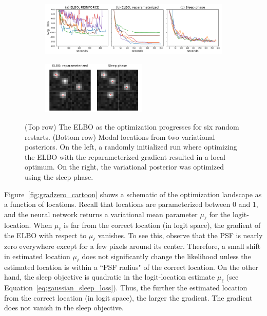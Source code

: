 \begin{figure}[!htb]
    \centering
    \begin{subfigure}[t]{0.9\textwidth}
    \centering
    \includegraphics[width=\textwidth]{figures/optim_path_compare.png}
    \end{subfigure}
    \begin{subfigure}[t]{\textwidth}
    \centering
    \includegraphics[width=0.55\textwidth]{figures/optim_path_detect_compare.png}
    \end{subfigure}
    \vspace{-3em}
    \caption{(Top row) The ELBO as the optimization progresses for six random restarts. 
    (Bottom row) Modal locations from two variational posteriors.
    On the left, a randomly initialized run where optimizing the ELBO with the reparameterized gradient resulted in a local optimum.
    On the right, the variational posterior 
    was optimized using the sleep phase. }
    \label{fig:optim_path}
\end{figure}

Figure~\ref{fig:gradzero_cartoon} shows a schematic of the optimization landscape as a function of locations.
Recall that locations are parameterized between 0 and 1, and the neural network returns a variational mean parameter $\mu_\ell$ for the logit-location. 
When $\mu_\ell$ is far from the correct location (in logit space), the gradient of the ELBO with respect to $\mu_\ell$ vanishes. 
To see this, observe that the PSF is nearly zero everywhere except for a few pixels around its center. Therefore, a small shift in estimated location $\mu_\ell$ does not significantly change the likelihood unless the estimated location is within a ``PSF radius" of the correct location.
On the other hand, the sleep objective is quadratic in the logit-location estimate $\mu_\ell$ (see Equation~\ref{eq:gaussian_sleep_loss}).
Thus, the further the estimated location from the correct location (in logit space), the larger the gradient. The gradient does not vanish in the sleep objective. 

